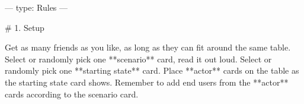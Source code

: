 ---
type: Rules
---

# 1. Setup

Get as many friends as you like, as long as they can fit around the same table.
Select or randomly pick one **scenario** card, read it out loud. Select or randomly pick one **starting state** card. Place **actor** cards on the table as the starting state card shows.
Remember to add end users from the **actor** cards according to the scenario card.
